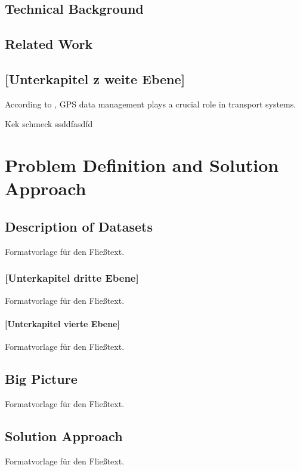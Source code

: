 \documentclass[a4paper,12pt,twoside]{scrreprt}
\begin{document}
\section{Technical Background}



\section{Related Work}






\section{[Unterkapitel z  weite Ebene]}

According to \cite{9615047}, GPS data management plays a crucial role in transport systems.

Kek schmeck \cite{eftelioglu_deep_2022} ssddfasdfd



\chapter{Problem Definition and Solution Approach}

\section{Description of Datasets}
Formatvorlage für den Fließtext.

\subsection{[Unterkapitel dritte Ebene]}
Formatvorlage für den Fließtext.

\subsubsection{[Unterkapitel vierte Ebene]}
Formatvorlage für den Fließtext.

\section{Big Picture}
Formatvorlage für den Fließtext.

\section{Solution Approach}
Formatvorlage für den Fließtext.
\end{document}
